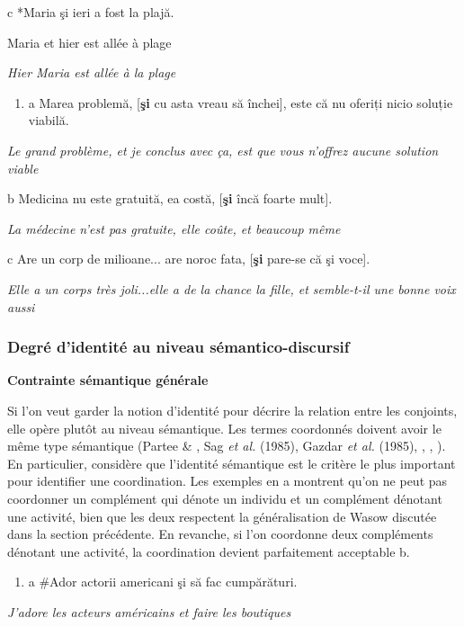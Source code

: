 c  *Maria  şi  ieri  a  fost  la  plajă. 

  Maria  et  hier  est  allée  à  plage

{\itshape
    Hier Maria est allée à la plage}


\begin{enumerate}
\item \label{bkm:Ref300777234}a  Marea problemă, [\textbf{şi} cu asta vreau să închei], este că nu oferiți nicio soluție viabilă.


\end{enumerate}
{\itshape
Le grand problème, et je conclus avec ça, est que vous n'offrez aucune solution viable}

  b  Medicina nu este gratuită, ea costă, [\textbf{şi} încă foarte mult].

{\itshape
La médecine n'est pas gratuite, elle coûte, et beaucoup même}

  c  Are un corp de milioane... are noroc fata, [\textbf{şi} pare-se că şi voce].

{\itshape
Elle a un corps très joli...elle a de la chance la fille, et semble-t-il une bonne voix aussi}

\subsubsection{Degré d'identité au niveau sémantico-discursif}
\label{bkm:Ref301431030}{\bfseries
Contrainte sémantique générale}

Si l'on veut garder la notion d'identité pour décrire la relation entre les conjoints, elle opère plutôt au niveau sémantique. Les termes coordonnés doivent avoir le même type sémantique (Partee \& \citet{Rooth1983}, Sag \textit{et al.} (1985), Gazdar \textit{et al.} (1985), \citet{Munn1993}, \citet{Johannessen1998}, \citet{Haspelmath2007}). En particulier, \citet{Haspelmath2007} considère que l'identité sémantique est le critère le plus important pour identifier une coordination. Les exemples en a montrent qu'on ne peut pas coordonner un complément qui dénote un individu et un complément dénotant une activité, bien que les deux respectent la généralisation de Wasow discutée dans la section précédente. En revanche, si l'on coordonne deux compléments dénotant une activité, la coordination devient parfaitement acceptable b. 


\begin{enumerate}
\item \label{bkm:Ref269838245}a  \#Ador actorii americani şi să fac cumpărături.


\end{enumerate}
{\itshape
J'adore les acteurs américains et faire les boutiques}

